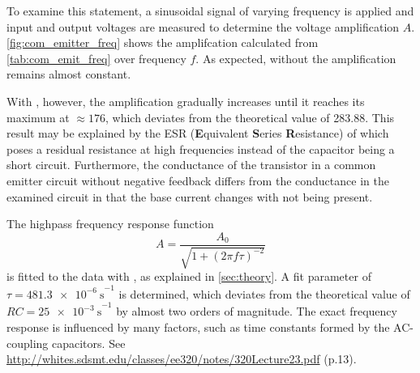 To examine this statement, a sinusoidal signal of varying frequency is applied and input and output voltages are measured to determine the voltage amplification $A$.
\autoref{fig:com_emitter_freq} shows the amplifcation calculated from \autoref{tab:com_emit_freq} over frequency $f$.
As expected, without  the amplification remains almost constant.

With , however, the amplification gradually increases until it reaches its maximum at $\approx\num{176}$, which deviates from the theoretical value of \num{283.88}.
This result may be explained by the ESR (\textbf{E}quivalent \textbf{S}eries \textbf{R}esistance) of  which poses a residual resistance at high frequencies instead of the capacitor being a short circuit.
Furthermore, the conductance of the transistor in a common emitter circuit without negative feedback differs from the conductance in the examined circuit in that the base current changes with  not being present.

The highpass frequency response function
\begin{equation*}
	A=\frac{A_0}{\sqrt{1 + (2\pi f\tau)^{-2}}}
\end{equation*}
is fitted to the data with , as explained in \autoref{sec:theory}.
A fit parameter of $\tau=\SI{481.3e-6}{\second}^{-1}$ is determined, which deviates from the theoretical value of $RC=\SI{25e-3}{\second}^{-1}$ by almost two orders of magnitude.%
The exact frequency response is influenced by many factors, such as time constants formed by the AC-coupling capacitors.
See \url{http://whites.sdsmt.edu/classes/ee320/notes/320Lecture23.pdf} (p.13).

